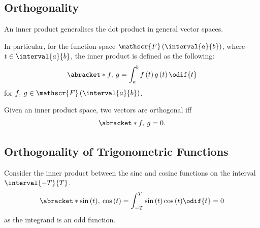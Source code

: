 \documentclass{article}
\begin{document}
\subsection{Orthogonality}
\begin{definition}
    An inner product generalises the dot product in general vector spaces.

    In particular, for the function space \(\mathscr{F}\left(
    \interval{a}{b} \right)\), where \(t \in \interval{a}{b}\), the
    inner product is defined as the following:
    \begin{equation*}
        \abracket*{f,\: g} = \int_a^b f\left( t \right) g\left( t \right) \odif{t}
    \end{equation*}
    for \(f,\: g \in \mathscr{F}\left( \interval{a}{b} \right)\).
\end{definition}
\begin{definition}[Orthogonality]
    Given an inner product space, two vectors are orthogonal iff
    \begin{equation*}
        \abracket*{f,\: g} = 0.
    \end{equation*}
\end{definition}
\subsection{Orthogonality of Trigonometric Functions}
Consider the inner product between the sine and cosine functions on the
interval \(\interval{-T}{T}\).
\begin{equation*}
    \abracket*{\sin{\left( t \right)},\: \cos{\left( t \right)}} = \int_{-T}^T \sin{\left( t \right)} \cos{\left( t \right)} \odif{t} = 0
\end{equation*}
as the integrand is an odd function.
\end{document}
